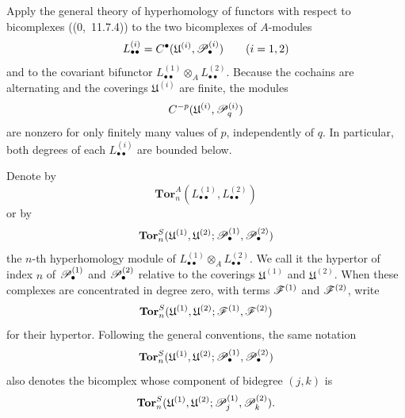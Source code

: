\begin{env}[6.6.2]
\label{III.6.6.2}
Apply the general theory of hyperhomology of functors with
respect to bicomplexes ((0,~11.7.4)) to the two
bicomplexes of $A$-modules
\[
  L_{\bullet\bullet}^{(i)}
  =
  C^\bullet(\mathfrak U^{(i)},\mathscr{P}_\bullet^{(i)})
  \qquad(i=1,2)
\]
and to the covariant bifunctor
$L_{\bullet\bullet}^{(1)}\otimes_A
 L_{\bullet\bullet}^{(2)}$.
Because the cochains are alternating and the coverings
$\mathfrak U^{(i)}$ are finite, the modules
\[
  C^{-p}(\mathfrak U^{(i)},\mathscr{P}_q^{(i)})
\]
are nonzero for only finitely many values of $p$, independently
of $q$.  In particular, both degrees of each
$L_{\bullet\bullet}^{(i)}$ are bounded below.

Denote by
\[
  \mathbf{Tor}_n^A
  (L_{\bullet\bullet}^{(1)},L_{\bullet\bullet}^{(2)})
\]
or by
\[
  \mathbf{Tor}_n^S
  (\mathfrak U^{(1)},\mathfrak U^{(2)};
   \mathscr{P}_\bullet^{(1)},\mathscr{P}_\bullet^{(2)})
\]
the $n$-th hyperhomology module of
$L_{\bullet\bullet}^{(1)}\otimes_A
 L_{\bullet\bullet}^{(2)}$.  We call it the hypertor of index
$n$ of $\mathscr{P}_\bullet^{(1)}$ and $\mathscr{P}_\bullet^{(2)}$ relative
to the coverings $\mathfrak U^{(1)}$ and
$\mathfrak U^{(2)}$.  When these complexes are concentrated in
degree zero, with terms $\mathscr{F}^{(1)}$ and $\mathscr{F}^{(2)}$, write
\[
  \mathbf{Tor}_n^S
  (\mathfrak U^{(1)},\mathfrak U^{(2)};
   \mathscr{F}^{(1)},\mathscr{F}^{(2)})
\]
for their hypertor.  Following the general conventions, the
same notation
\[
  \mathbf{Tor}_n^S
  (\mathfrak U^{(1)},\mathfrak U^{(2)};
   \mathscr{P}_\bullet^{(1)},\mathscr{P}_\bullet^{(2)})
\]
also denotes the bicomplex whose component of bidegree $(j,k)$
is
\[
  \mathbf{Tor}_n^S
  (\mathfrak U^{(1)},\mathfrak U^{(2)};
   \mathscr{P}_j^{(1)},\mathscr{P}_k^{(2)}).
\]


\end{env}
